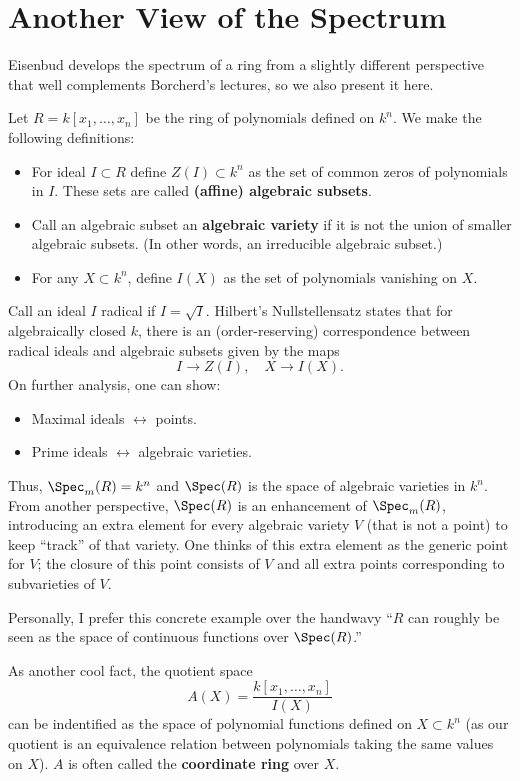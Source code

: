 \section{Another View of the Spectrum}

Eisenbud develops the spectrum of a ring from a slightly different perspective that well complements Borcherd's lectures, so we also present it here.

Let $R = k[x_1, \dots, x_n]$ be the ring of polynomials defined on $k^n$. We make the following definitions:
\begin{itemize}
    \item For ideal $I \subset R$ define $Z(I) \subset k^n$ as the set of common zeros of polynomials in $I$. These sets are called \textbf{(affine) algebraic subsets}.
    \item Call an algebraic subset an \textbf{algebraic variety} if it is not the union of smaller algebraic subsets. (In other words, an irreducible algebraic subset.)
    \item For any $X \subset k^n$, define $I(X)$ as the set of polynomials vanishing on $X$.
\end{itemize}
Call an ideal $I$ radical if $I = \sqrt{I}$. Hilbert's Nullstellensatz states that for algebraically closed $k$, there is an (order-reserving) correspondence between radical ideals and algebraic subsets given by the maps
\[
    I \to Z(I), \quad X \to I(X).
\]
On further analysis, one can show:
\begin{itemize}
    \item Maximal ideals $\leftrightarrow$ points.
    \item Prime ideals $\leftrightarrow$ algebraic varieties.
\end{itemize}
Thus, $\Spec_m(R) = k^n$ and $\Spec(R)$ is the space of algebraic varieties in $k^n$. From another perspective, $\Spec(R)$ is an enhancement of $\Spec_m(R)$, introducing an extra element for every algebraic variety $V$ (that is not a point) to keep ``track'' of that variety. One thinks of this extra element as the generic point for $V$; the closure of this point consists of $V$ and all extra points corresponding to subvarieties of $V$.

Personally, I prefer this concrete example over the handwavy ``$R$ can roughly be seen as the space of continuous functions over $\Spec(R)$.''

As another cool fact, the quotient space
\[
    A(X) = \frac{k[x_1, \dots, x_n]}{I(X)}
\]
can be indentified as the space of polynomial functions defined on $X \subset k^n$ (as our quotient is an equivalence relation between polynomials taking the same values on $X$). $A$ is often called the \textbf{coordinate ring} over $X$.

